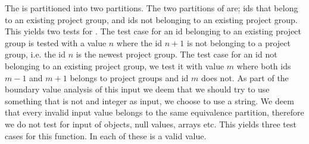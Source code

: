 The \vargroupid{} is partitioned into two partitions.
The two partitions of \vargroupid{} are; ids that belong to an existing project group, and ids not belonging to an existing project group.
%
%
This yields two tests for \vargroupid{}.
The test case for an id belonging to an existing project group is tested with a value $n$ where the id $n+1$ is not belonging to a project group, i.e. the id $n$ is the newest project group.
The test case for an id not belonging to an existing project group, we test it with value $m$ where both ids $m-1$ and $m+1$ belongs to project groups and id $m$ does not.
As part of the boundary value analysis of this input we deem that we should try to use something that is not and integer as input, we choose to use a string.
We deem that every invalid input value belongs to the same equivalence partition, therefore we do not test for input of objects, null values, arrays etc.
This yields three test cases for this function.
In each of these \varuserids{} is a valid value.

